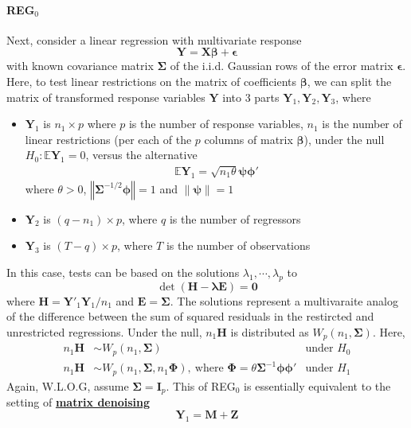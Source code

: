 \documentclass[twoside]{article}
\begin{document}
\paragraph*{REG$_0$} Next, consider a linear regression with multivariate response $$ \mathbf{Y} = \mathbf{X}\boldsymbol{\beta} + \boldsymbol{\epsilon} $$ with known covariance matrix $\boldsymbol{\Sigma}$ of the i.i.d. Gaussian rows of the error matrix $\boldsymbol{\epsilon}$. Here, to test linear restrictions on the matrix of coefficients $\boldsymbol{\beta}$, we can split the matrix of transformed response variables $\mathbf{Y}$ into 3 parts $\mathbf{Y}_1,\mathbf{Y}_2,\mathbf{Y}_3$, where 
\begin{itemize}
    \item $\mathbf{Y}_1$ is $n_1\times p$ where $p$ is the number of response variables, $n_1$ is the number of linear restrictions (per each of the $p$ columns of matrix $\boldsymbol{\beta}$), under the null $H_0: \mathbb{E}\mathbf{Y}_1 = 0$, versus the alternative \begin{align}\label{eq:REG_alternative}
        \mathbb{E}\mathbf{Y}_1 = \sqrt{n_1\theta}\boldsymbol{\psi\phi'}
    \end{align}
    where $\theta>0$, $\left\Vert \boldsymbol{\Sigma}^{-1/2}\boldsymbol{\phi}\right\Vert = 1$ and $\lVert \boldsymbol{\psi}\rVert = 1$
    \item $\mathbf{Y}_2$ is $(q-n_1)\times p$, where $q$ is the number of regressors
    \item $\mathbf{Y}_3$ is $(T-q)\times p$, where $T$ is the number of observations
\end{itemize}
In this case, tests can be based on the solutions $\lambda_1,\cdots,\lambda_p$ to $$ \det \left( \mathbf{H}-\boldsymbol{\lambda }\mathbf{E} \right)=\mathbf{0} $$
where $\mathbf{H} = \mathbf{Y}'_1\mathbf{Y}_1/n_1$ and $\mathbf{E}=\boldsymbol{\Sigma}$. The solutions represent a multivaraite analog of the difference between the sum of squared residuals in the restircted and unrestricted regressions. Under the null, $n_1\mathbf{H}$ is distributed as $W_p(n_1,\boldsymbol{\Sigma})$. Here, 
\begin{align*}
    n_1\mathbf{H} & \sim W_p(n_1,\boldsymbol{\Sigma}) & \text{under }H_0\\
    n_1\mathbf{H} & \sim W_p(n_1,\boldsymbol{\Sigma},n_1\boldsymbol{\Phi}),\ \text{where }\boldsymbol{\Phi} = \theta \boldsymbol{\Sigma}^{-1}\boldsymbol{\phi\phi}' & \text{under }H_1
\end{align*}
Again, W.L.O.G, assume $\boldsymbol{\Sigma} = \mathbf{I}_p$. This  of REG$_0$ is essentially equivalent to the setting of \textbf{\underline{matrix denoising}}
$$
\mathbf{Y}_1 = \mathbf{M}+ \mathbf{Z}
$$
\end{document}
